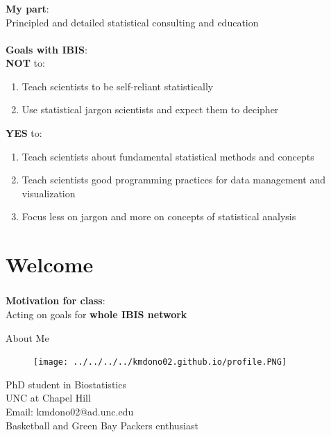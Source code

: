 \documentclass[xcolor=dvipsnames]{beamer}
\begin{document}
\begin{frame}
\frametitle{\insertsectionhead}
\textbf{My part}:\\
Principled and detailed statistical consulting and education\\~\\

\textbf{Goals with IBIS}:\\
\textbf{NOT} to:
\begin{enumerate}
\item Teach scientists to be self-reliant statistically
\item Use statistical jargon scientists and expect them to decipher
\end{enumerate}
\textbf{YES} to:
\begin{enumerate}
\item Teach scientists about fundamental statistical methods and concepts
\item Teach scientists good programming practices for data management and visualization
\item Focus less on jargon and more on concepts of statistical analysis
\end{enumerate}
\end{frame}

\section{Welcome}
\begin{frame}
\frametitle{\insertsectionhead}
\textbf{Motivation for class}:\\
Acting on goals for \textbf{whole IBIS network}

\begin{exampleblock}{About Me}
\begin{figure}
\texttt{[image: ../../../../kmdono02.github.io/profile.PNG]}
\end{figure}
PhD student in Biostatistics\\
UNC at Chapel Hill\\
Email: kmdono02@ad.unc.edu\\
Basketball and Green Bay Packers enthusiast
\end{exampleblock}
\end{frame}
\end{document}
